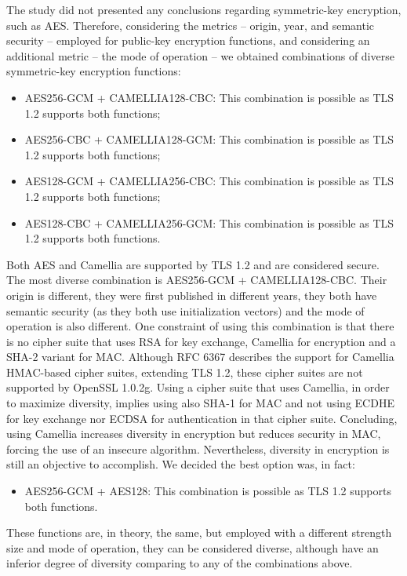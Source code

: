 \documentclass{sig-alternate-05-2015}
\begin{document}
The study did not presented any conclusions regarding symmetric-key encryption, such as AES. Therefore, considering the metrics -- origin, year, and semantic security -- employed for public-key encryption functions, and considering an additional metric -- the mode of operation -- we obtained combinations of diverse symmetric-key encryption functions:
\begin{itemize}
\item {AES256-GCM + CAMELLIA128-CBC: This combination is possible as TLS 1.2 supports both functions;}
\item {AES256-CBC + CAMELLIA128-GCM: This combination is possible as TLS 1.2 supports both functions;}
\item {AES128-GCM + CAMELLIA256-CBC: This combination is possible as TLS 1.2 supports both functions;}
\item {AES128-CBC + CAMELLIA256-GCM: This combination is possible as TLS 1.2 supports both functions.}
\end{itemize}

Both AES and Camellia are supported by TLS 1.2 and are considered secure. The most diverse combination is AES256-GCM + CAMELLIA128-CBC. Their origin is different, they were first published in different years, they both have semantic security (as they both use initialization vectors) and the mode of operation is also different. One constraint of using this combination is that there is no cipher suite that uses RSA for key exchange, Camellia for encryption and a SHA-2 variant for MAC. Although RFC 6367 \cite{RFC6367} describes the support for Camellia HMAC-based cipher suites, extending TLS 1.2, these cipher suites are not supported by OpenSSL 1.0.2g. Using a cipher suite that uses Camellia, in order to maximize diversity, implies using also SHA-1 for MAC and not using ECDHE for key exchange nor ECDSA for authentication in that cipher suite. Concluding, using Camellia increases diversity in encryption but reduces security in MAC, forcing the use of an insecure algorithm. Nevertheless, diversity in encryption is still an objective to accomplish. We decided the best option was, in fact:
\begin{itemize}
\item {AES256-GCM + AES128: This combination is possible as TLS 1.2 supports both functions.}
\end{itemize}
These functions are, in theory, the same, but employed with a different strength size and mode of operation, they can be considered diverse, although have an inferior degree of diversity comparing to any of the combinations above.
\end{document}
